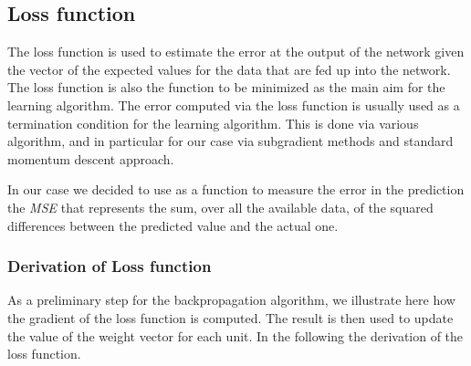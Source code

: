 \subsection{Loss function}
The loss function is used to estimate the error at the output of the network given the vector of the expected values for the data that are fed up into the network. The loss function is also the function to be minimized as the main aim for the learning algorithm. The error computed via the loss function is usually used as a termination condition for the learning algorithm. This is done via various algorithm, and in particular for our case via subgradient methods and standard momentum descent approach.\newline

In our case we decided to use as a function to measure the error in the prediction the \textit{MSE} that represents the sum, over all the available data, of the squared differences between the predicted value and the actual one.\newline

\subsubsection{Derivation of Loss function}
As a preliminary step for the backpropagation algorithm, we illustrate here how the gradient of the loss function is computed. The result is then used to update the value of the weight vector for each unit. In the following the derivation of the loss function.\newline\newline
{}

